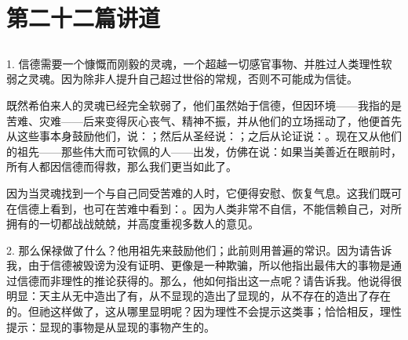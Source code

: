 

\section{第二十二篇讲道}


\subsection{}

\par

1. 信德需要一个慷慨而刚毅的灵魂，一个超越一切感官事物、并胜过人类理性软弱之灵魂。因为除非人提升自己超过世俗的常规，否则不可能成为信徒。\par

既然希伯来人的灵魂已经完全软弱了，他们虽然始于信德，但因环境——我指的是苦难、灾难——后来变得灰心丧气、精神不振，并从他们的立场摇动了，他便首先从这些事本身鼓励他们，说：；然后从圣经说：；之后从论证说：。现在又从他们的祖先——那些伟大而可钦佩的人——出发，仿佛在说：如果当美善近在眼前时，所有人都因信德而得救，那么我们更当如此了。\par

因为当灵魂找到一个与自己同受苦难的人时，它便得安慰、恢复气息。这我们既可在信德上看到，也可在苦难中看到：。因为人类非常不自信，不能信赖自己，对所拥有的一切都战战兢兢，并高度重视多数人的意见。\par

2. 那么保禄做了什么？他用祖先来鼓励他们；此前则用普遍的常识。因为请告诉我，由于信德被毁谤为没有证明、更像是一种欺骗，所以他指出最伟大的事物是通过信德而非理性的推论获得的。那么，他如何指出这一点呢？请告诉我。他说得很明显：天主从无中造出了有，从不显现的造出了显现的，从不存在的造出了存在的。但祂这样做了，这从哪里显明呢？因为理性不会提示这类事；恰恰相反，理性提示：显现的事物是从显现的事物产生的。\par

